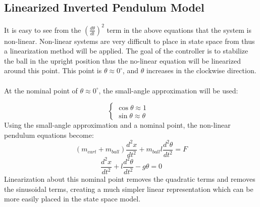 \documentclass[12pt]{article} %
\begin{document}
\subsection{Linearized Inverted Pendulum Model}
It is easy to see from the $(\frac{d\theta}{dt})^2$ term in the above equations that the system is non-linear. Non-linear systems are very difficult to place in state space from thus a linearization  method will be applied. The goal of the controller is to stabilize the ball in the upright position thus the no-linear equation will be linearized around this point. This point is $\theta \approx 0^{\circ}$, and $\theta$ increases in the clockwise direction. \\\\
At the nominal point of $\theta \approx 0^{\circ}$, the small-angle approximation will be used:

\begin{equation} \label{eq:small}
\begin{cases}
\cos\theta \approx 1 &\\
\sin\theta \approx \theta &
\end{cases}
\end{equation}
Using the small-angle approximation and a nominal point, the non-linear pendulum equations become:
\begin{equation} \label{eq:linear1}
(m_{cart} + m_{ball})\frac{d^2x}{dt^2} + m_{ball}l\frac{d^2\theta}{dt^2} = F
\end{equation}
\begin{equation} \label{eq:linear2}
\frac{d^2x}{dt^2} + l\frac{d^2\theta}{dt^2} - g\theta = 0
\end{equation}
Linearization about this nominal point removes the quadratic terms and removes the sinusoidal terms, creating a much simpler linear representation which can be more easily placed in the state space model.
\end{document}
